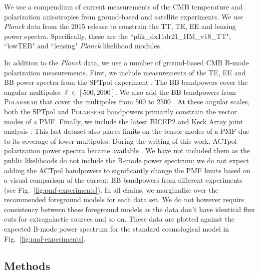\documentclass[apj]{emulateapj}
\newcommand{\planck}{{\sl Planck}}
\newcommand{\pb}{\textsc{Polarbear}}
\newcommand{\sptpol}{SPTpol}
\begin{document}
We use a compendium of current measurements of the CMB temperature and polarization anisotropies from ground-based and satellite experiments. 
We use \planck{} data from the 2015 release to constrain the TT, TE, EE and lensing power spectra. 
Specifically, these are the ``plik\_dx11dr21\_HM\_v18\_TT", ``lowTEB" and ``lensing" \planck{} likelihood modules.


In addition to the \planck{} data, we use a number of ground-based CMB B-mode polarization measurements. 
First, we include measurements of the TE, EE and BB power spectra from the \sptpol{} experiment \citep{crites15,keisler15}. 
The BB bandpowers cover the angular multipoles $\ell \in [500,2000]$. 
We also add the BB bandpowers from \pb{} that cover the multipoles from 500 to 2500 \citep{polarbear15}. 
At these angular scales, both the \sptpol{} and \pb{} bandpowers primarily constrain the vector modes of a PMF. 
Finally, we include the latest BICEP2 and Keck Array  joint analysis \citep{bicepkeck15}. 
This last dataset also places limits on the tensor modes of a PMF due to its coverage of lower multipoles. 
During the writing of this work, ACTpol polarization power spectra became available \citep{naess14,louis16}. 
We have not included them as the public likelihoods do not include the B-mode power spectrum; we do not expect adding the ACTpol bandpowers to significantly change the PMF limits based on a visual comparison of the current BB bandpowers from different experiments (see Fig.~\ref{fig:pmf-experiments}).
In all chains, we marginalize over the recommended foreground models for each data set. 
We do not however require consistency between these foreground models as the data don't have identical flux cuts for extragalactic sources and so on. 
These data are plotted against the expected B-mode power spectrum for the standard cosmological model in Fig.~\ref{fig:pmf-experiments}. 

\subsection{Methods}
\end{document}
